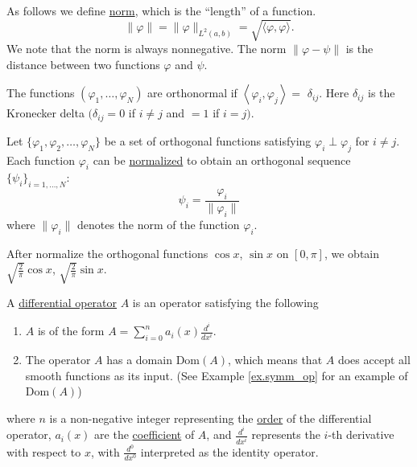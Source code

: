 \begin{definition}[Norm]
As follows we define \underline{norm}, which is the ``length'' of a function.
$$
\|\varphi\|=\|\varphi\|_{L^2(a, b)}=\sqrt{\langle\varphi, \varphi\rangle} .
$$
We note that the norm is always nonnegative. The norm $\|\varphi-\psi\|$ is the distance between two functions $\varphi$ and $\psi$.
\end{definition}

\begin{definition}[Orthonormal]
    The functions $\left(\varphi_1, \ldots, \varphi_N\right)$ are orthonormal if $\left\langle\varphi_i, \varphi_j\right\rangle=$ $\delta_{i j}$. Here $\delta_{i j}$ is the Kronecker delta $(\delta_{i j}=0$ if $i \neq j$ and $=1$ if $i=j)$.
\end{definition}

\begin{definition}[Normalization]
    Let $\{\varphi_1, \varphi_2, \ldots, \varphi_N\}$ be a set of orthogonal functions satisfying $\varphi_i \perp \varphi_j$ for $i \neq j$. Each function $\varphi_i$ can be \underline{normalized} to obtain an orthogonal sequence $\{\psi_i\}_{i = 1, \dots, N}$:
    \[
    \psi_i = \frac{\varphi_i}{\|\varphi_i\|}
    \]
    where $\|\varphi_i\|$ denotes the norm of the function $\varphi_i$.
    
\end{definition}

\begin{example}[]
    After normalize the orthogonal functions $\cos x$, $\sin x$ on $[0, \pi]$, we obtain $\sqrt{\frac{2}{\pi}}\cos x$, $\sqrt{\frac{2}{\pi}}\sin x$.
\end{example}

\begin{definition}
    A \underline{differential operator} $A$ is an operator satisfying the following
    \begin{enumerate}
        \item $A$ is of the form $A = \sum_{i=0}^{n} a_i(x) \frac{d^i}{dx^i}$.
        \item The operator $A$ has a domain $\mathrm{Dom}(A)$, which means that $A$ does accept all smooth functions as its input. (See Example \ref{ex.symm_op} for an example of $\mathrm{Dom}(A)$)
    \end{enumerate}  
    \noindent where $n$ is a non-negative integer representing the \underline{order} of the differential operator, $a_i(x)$ are the \underline{coefficient} of $A$, and $\frac{d^i}{dx^i}$ represents the $i$-th derivative with respect to $x$, with $\frac{d^0}{dx^0}$ interpreted as the identity operator.

\end{definition}

